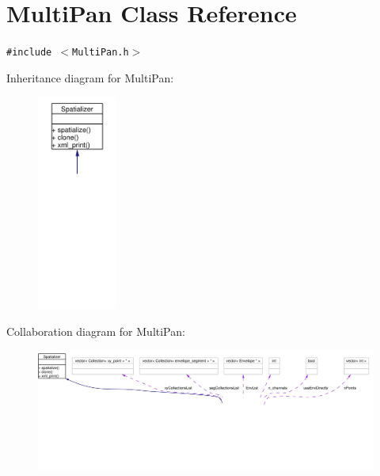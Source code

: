 \hypertarget{classMultiPan}{
\section{Multi\-Pan Class Reference}
\label{classMultiPan}
}
{\tt \#include $<$Multi\-Pan.h$>$}

Inheritance diagram for Multi\-Pan:\begin{figure}[H]
\begin{center}
\leavevmode
\includegraphics[width=74pt]{classMultiPan__inherit__graph}
\end{center}
\end{figure}
Collaboration diagram for Multi\-Pan:\begin{figure}[H]
\begin{center}
\leavevmode
\includegraphics[width=420pt]{classMultiPan__coll__graph}
\end{center}
\end{figure}

